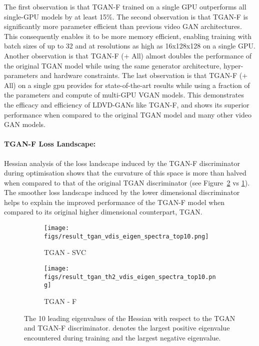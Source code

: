 \documentclass[a4paper,fleqn]{cas-sc}
\begin{document}
The first observation is that TGAN-F trained on a single GPU outperforms all single-GPU models by at least 15\%.  The second observation is that TGAN-F is significantly more parameter efficient than previous video GAN architectures. This consequently enables it to be more memory efficient, enabling training with batch sizes of up to 32 and at resolutions as high as 16x128x128 on a single GPU. Another observation is that TGAN-F (+ All) almost doubles the performance of the original TGAN model while using the same generator architecture, hyper-parameters and hardware constraints. The last observation is that TGAN-F (+ All) on a single gpu provides for state-of-the-art results while using a fraction of the parameters and compute of multi-GPU VGAN models. This demonstrates the efficacy and efficiency of LDVD-GANs like TGAN-F, and shows its superior performance when compared to the original TGAN model and many other video GAN models.

\paragraph{TGAN-F Loss Landscape:} Hessian analysis of the loss landscape induced by the TGAN-F discriminator during optimisation shows that the curvature of this space is more than halved when compared to that of the original TGAN discriminator (see Figure~\ref{fig:TGAN_F_EV_comp} vs \ref{fig:TGAN_EV_comp}). 
The smoother loss landscape induced by the lower dimensional discriminator helps to explain the improved performance of the TGAN-F model when compared to its original higher dimensional counterpart, TGAN. 

\begin{figure}[pos=!h]
    \centering
    \begin{subfigure}[t]{0.5\textwidth}
        \centering
        \texttt{[image: figs/result\_tgan\_vdis\_eigen\_spectra\_top10.png]}
        \caption{TGAN - SVC}
        \label{fig:TGAN_EV_comp}
    \end{subfigure}\begin{subfigure}[t]{0.5\textwidth}
        \centering
        \texttt{[image: figs/result\_tgan\_th2\_vdis\_eigen\_spectra\_top10.png]}
        \caption{TGAN - F}
        \label{fig:TGAN_F_EV_comp}
    \end{subfigure}
\caption{The 10 leading eigenvalues of the Hessian with respect to the TGAN and TGAN-F discriminator.   denotes the largest positive eigenvalue encountered during training and  the largest negative eigenvalue.} 
    \label{fig:TGAN_EV_Comp}
\end{figure}
\end{document}
